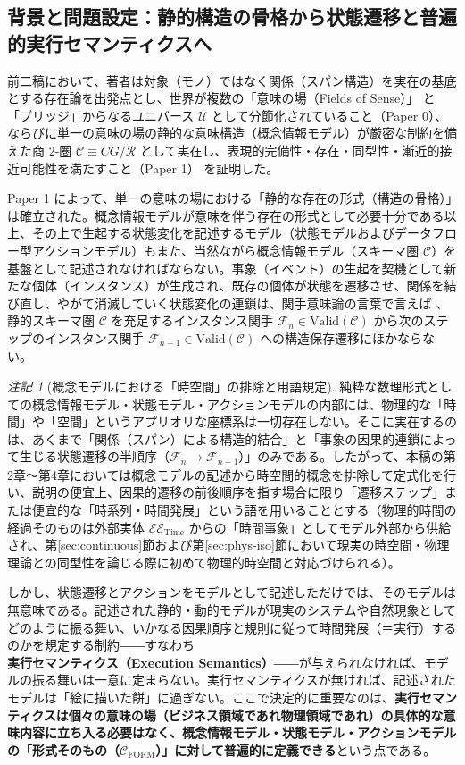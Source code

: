 \documentclass[11pt,a4paper]{ltjsarticle}
\theoremstyle{definition}
\theoremstyle{plain}
\theoremstyle{remark}
\newtheorem{remark}{注記}[section]
\newcommand{\Valid}{\mathrm{Valid}}
\newcommand{\Cform}{\mathcal{C}_{\mathrm{FORM}}}
\begin{document}
\subsection{背景と問題設定：静的構造の骨格から状態遷移と普遍的実行セマンティクスへ}
前二稿において、著者は対象（モノ）ではなく関係（スパン構造）を実在の基底とする存在論を出発点とし、世界が複数の「意味の場（Fields of Sense）」\cite{gabriel2015} と「ブリッジ」からなるユニバース $\mathcal{U}$ として分節化されていること（Paper 0）\cite{ota2026paper0}、ならびに単一の意味の場の静的な意味構造（概念情報モデル）が厳密な制約を備えた商 2-圏 $\mathcal{C} \equiv CG/\mathcal{R}$ として実在し、表現的完備性・存在・同型性・漸近的接近可能性を満たすこと（Paper 1）\cite{ota2026paper1} を証明した。

Paper 1 によって、単一の意味の場における「静的な存在の形式（構造の骨格）」は確立された。概念情報モデルが意味を伴う存在の形式として必要十分である以上、その上で生起する状態変化を記述するモデル（状態モデルおよびデータフロー型アクションモデル）もまた、当然ながら概念情報モデル（スキーマ圏 $\mathcal{C}$）を基盤として記述されなければならない。事象（イベント）の生起を契機として新たな個体（インスタンス）が生成され、既存の個体が状態を遷移させ、関係を結び直し、やがて消滅していく状態変化の連鎖は、関手意味論の言葉で言えば \cite{lawvere1963,maclane1998}、静的スキーマ圏 $\mathcal{C}$ を充足するインスタンス関手 $\mathcal{F}_n \in \Valid(\mathcal{C})$ から次のステップのインスタンス関手 $\mathcal{F}_{n+1} \in \Valid(\mathcal{C})$ への構造保存遷移にほかならない。

\begin{remark}[概念モデルにおける「時空間」の排除と用語規定]\label{rem:no-spacetime}
純粋な数理形式としての概念情報モデル・状態モデル・アクションモデルの内部には、物理的な「時間」や「空間」というアプリオリな座標系は一切存在しない。そこに実在するのは、あくまで「関係（スパン）による構造的結合」と「事象の因果的連鎖によって生じる状態遷移の半順序（$\mathcal{F}_n \to \mathcal{F}_{n+1}$）」のみである。したがって、本稿の第2章〜第4章においては概念モデルの記述から時空間的概念を排除して定式化を行い、説明の便宜上、因果的遷移の前後順序を指す場合に限り「遷移ステップ」または便宜的な「時系列・時間発展」という語を用いることとする（物理的時間の経過そのものは外部実体 $\mathcal{EE}_{\mathrm{Time}}$ からの「時間事象」としてモデル外部から供給され、第\ref{sec:continuous}節および第\ref{sec:phys-iso}節において現実の時空間・物理理論との同型性を論じる際に初めて物理的時空間と対応づけられる）。
\end{remark}

しかし、状態遷移とアクションをモデルとして記述しただけでは、そのモデルは無意味である。記述された静的・動的モデルが現実のシステムや自然現象としてどのように振る舞い、いかなる因果順序と規則に従って時間発展（＝実行）するのかを規定する制約――すなわち\textbf{実行セマンティクス（Execution Semantics）}――が与えられなければ、モデルの振る舞いは一意に定まらない。実行セマンティクスが無ければ、記述されたモデルは「絵に描いた餅」に過ぎない。ここで決定的に重要なのは、\textbf{実行セマンティクスは個々の意味の場（ビジネス領域であれ物理領域であれ）の具体的な意味内容に立ち入る必要はなく、概念情報モデル・状態モデル・アクションモデルの「形式そのもの（$\Cform$）」に対して普遍的に定義できる}という点である。
\end{document}
